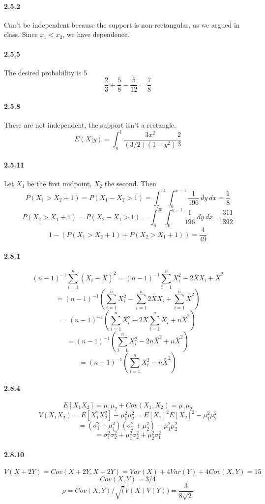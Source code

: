 \documentclass[10pt,letter]{article}
\begin{document}
\paragraph{2.5.2}
Can't be independent because the support is non-rectangular, as we argued in class. Since $x_1 < x_2$, we have dependence.
\paragraph{2.5.5}
The desired probability is 5
\[ \frac{2}{3} + \frac{5}{8} - \frac{5}{12} = \frac{7}{8} \]
\paragraph{2.5.8}
These are not independent, the support isn't a rectangle.
\[ E(X|y) = \int_y^1 \frac{3x^2}{(3/2)(1-y^2)} \frac{2}{3} \]
\paragraph{2.5.11}
Let $X_1$ be the first midpoint, $X_2$ the second. Then
\[ P(X_1 > X_2 + 1) = P(X_1 - X_2 > 1) = \int_7^14 \int_6^{x-1} \frac{1}{196} \ dy \ dx =\frac{1}{8}  \]
\[ P(X_2 > X_1 + 1) = P(X_2 - X_1 > 1) = \int_6^20 \int_{0}^{y-1} \frac{1}{196} \ dy \ dx = \frac{311}{392} \]
\[ 1 - (P(X_1 > X_2 + 1) + P(X_2 > X_1 + 1)) = \frac{4}{49} \]
\paragraph{2.8.1}
\[ (n-1)^{-1} \sum_{i=1}^n(X_i - \bar{X})^2 = (n-1)^{-1} \sum_{i=1}^nX_i^2 - 2\bar{X}X_i + \bar{X}^2 \]
\[ = (n-1)^{-1}\left(  \sum_{i=1}^nX_i^2 - \sum_{i=1}^n2\bar{X}X_i + \sum_{i=1}^n \bar{X}^2  \right) \]
\[ = (n-1)^{-1}\left(  \sum_{i=1}^nX_i^2 -2\bar{X} \sum_{i=1}^nX_i + n\bar{X}^2  \right) \]
\[ = (n-1)^{-1}\left(  \sum_{i=1}^nX_i^2 -2n\bar{X}^2 + n\bar{X}^2  \right) \]
\[ = (n-1)^{-1}\left(  \sum_{i=1}^nX_i^2 -n\bar{X}^2   \right) \]
\paragraph{2.8.4}
\[ E[X_1X_2] = \mu_1\mu_2 + Cov(X_1, X_2) = \mu_1\mu_2 \]
\[ V(X_1X_2) = E[X_1^2X_2^2] - \mu_1^2\mu_2^2 = E[X_1]^2 E[X_2]^2 - \mu_1^2 \mu_2^2\]
\[ = (\sigma_1^2 + \mu_1^2)(\sigma_2^2 + \mu_2^2) - \mu_1^2 \mu_2^2 \]
\[ = \sigma_1^2\sigma_2^2 + \mu_1^2\sigma_2^2 + \mu_2^2\sigma_1^2 \]
\paragraph{2.8.10}
\[V(X+2Y) = Cov(X+2Y, X+2Y) = Var(X) + 4Var(Y) + 4Cov(X, Y) = 15 \]
\[ Cov(X,Y) = 3/4 \]
\[ \rho = Cov(X,Y) / \sqrt(V(X)V(Y)) = \frac{3}{8\sqrt{2}}\]
\end{document}

